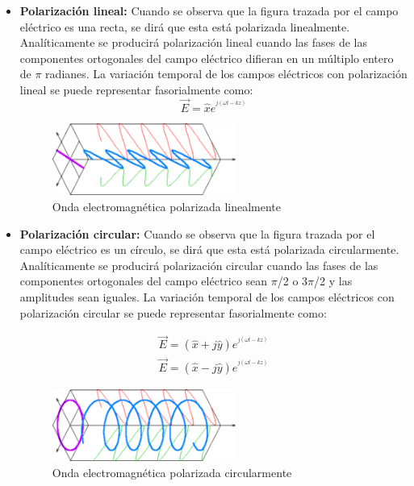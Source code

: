 \begin{itemize}
\item\textbf{Polarización lineal: }Cuando se observa que la figura trazada por el campo eléctrico es una recta, se dirá que esta está polarizada linealmente. Analíticamente se producirá polarización lineal cuando las fases de las componentes ortogonales del campo eléctrico difieran en un múltiplo entero de $\pi$ radianes. La variación temporal de los campos eléctricos con polarización lineal se puede representar fasorialmente como:
\begin{equation}
	\vec{E} = \hat{x}e^{^{j(\omega t-kz)}}
	\label{eq:pollineal}
\end{equation}
\begin{figure}[H]
    \centering
        \includegraphics[width=6cm]{archivos/polarizacion/lineal}
        \caption{Onda electromagnética polarizada linealmente}
        \label{fig:pollin}
\end{figure}
\item\textbf{Polarización circular: }Cuando se observa que la figura trazada por el campo eléctrico es un círculo, se dirá que esta está polarizada circularmente. Analíticamente se producirá polarización circular cuando las fases de las componentes ortogonales del campo eléctrico sean $\pi$/2 o 3$\pi$/2 y las amplitudes sean iguales. La variación temporal de los campos eléctricos con polarización circular se puede representar fasorialmente como:

\begin{subequations}
	\begin{eqnarray}
		\vec{E} = (\hat{x}+j\hat{y})e^{^{j(\omega t-kz)}} \label{ecu:polcirlev} \\ %
		\vec{E} = (\hat{x}-j\hat{y})e^{^{j(\omega t-kz)}} \label{ecu:polcirdex} 
	\end{eqnarray}
\end{subequations}

\begin{figure}[H]
    \centering
        \includegraphics[width=6cm]{archivos/polarizacion/circular}
        \caption{Onda electromagnética polarizada circularmente}
        \label{fig:polcir}
\end{figure}


\end{itemize}
